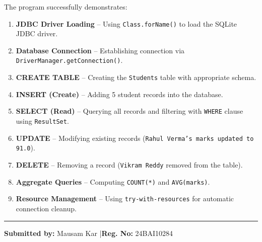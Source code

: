 \documentclass[12pt,a4paper]{article}
\begin{document}
The program successfully demonstrates:
\begin{enumerate}
  \item \textbf{JDBC Driver Loading} -- Using \texttt{Class.forName()} to load the SQLite JDBC driver.
  \item \textbf{Database Connection} -- Establishing connection via \texttt{DriverManager.getConnection()}.
  \item \textbf{CREATE TABLE} -- Creating the \texttt{Students} table with appropriate schema.
  \item \textbf{INSERT (Create)} -- Adding 5 student records into the database.
  \item \textbf{SELECT (Read)} -- Querying all records and filtering with \texttt{WHERE} clause using \texttt{ResultSet}.
  \item \textbf{UPDATE} -- Modifying existing records (\texttt{Rahul Verma's marks updated to 91.0}).
  \item \textbf{DELETE} -- Removing a record (\texttt{Vikram Reddy} removed from the table).
  \item \textbf{Aggregate Queries} -- Computing \texttt{COUNT(*)} and \texttt{AVG(marks)}.
  \item \textbf{Resource Management} -- Using \texttt{try-with-resources} for automatic connection cleanup.
\end{enumerate}

\vspace{1cm}
\noindent\rule{\textwidth}{0.4pt}
\begin{center}
  \textbf{Submitted by:} Mausam Kar \quad|\quad \textbf{Reg. No:} 24BAI10284
\end{center}
\end{document}

